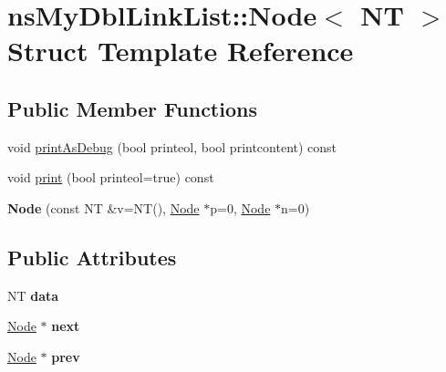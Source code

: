 \hypertarget{structnsMyDblLinkList_1_1Node}{\section{ns\-My\-Dbl\-Link\-List\-:\-:Node$<$ N\-T $>$ Struct Template Reference}
\label{structnsMyDblLinkList_1_1Node}
}
\subsection*{Public Member Functions}
\begin{DoxyCompactItemize}
\item 
void \hyperlink{structnsMyDblLinkList_1_1Node_a1c685aa2d3b6235a0d158eeeb22e2e4f}{print\-As\-Debug} (bool printeol, bool printcontent) const 
\item 
void \hyperlink{structnsMyDblLinkList_1_1Node_ac0314baa23270d6bfb9c23826dcbd51a}{print} (bool printeol=true) const 
\item 
\hypertarget{structnsMyDblLinkList_1_1Node_a90e2de7612789da1dc60ac3a92d608e5}{{\bfseries Node} (const N\-T \&v=N\-T(), \hyperlink{structnsMyDblLinkList_1_1Node}{Node} $\ast$p=0, \hyperlink{structnsMyDblLinkList_1_1Node}{Node} $\ast$n=0)}\label{structnsMyDblLinkList_1_1Node_a90e2de7612789da1dc60ac3a92d608e5}

\end{DoxyCompactItemize}
\subsection*{Public Attributes}
\begin{DoxyCompactItemize}
\item 
\hypertarget{structnsMyDblLinkList_1_1Node_ae196dd88673937bbfec78aaba34b8633}{N\-T {\bfseries data}}\label{structnsMyDblLinkList_1_1Node_ae196dd88673937bbfec78aaba34b8633}

\item 
\hypertarget{structnsMyDblLinkList_1_1Node_a29c3ef4c274baee8254ba5b9590a12df}{\hyperlink{structnsMyDblLinkList_1_1Node}{Node} $\ast$ {\bfseries next}}\label{structnsMyDblLinkList_1_1Node_a29c3ef4c274baee8254ba5b9590a12df}

\item 
\hypertarget{structnsMyDblLinkList_1_1Node_a5186b20a38e08d11ff9507f933b92b63}{\hyperlink{structnsMyDblLinkList_1_1Node}{Node} $\ast$ {\bfseries prev}}\label{structnsMyDblLinkList_1_1Node_a5186b20a38e08d11ff9507f933b92b63}

\end{DoxyCompactItemize}


